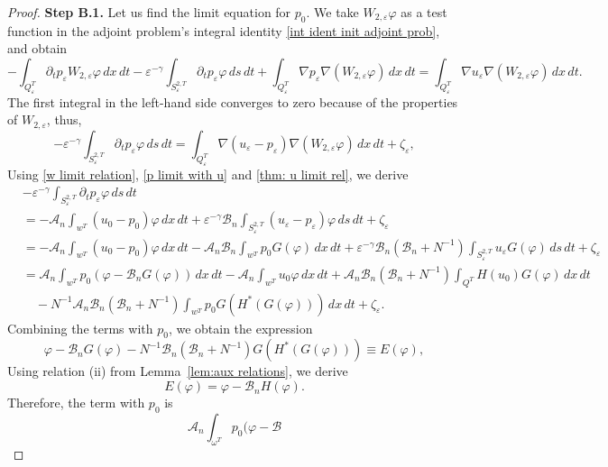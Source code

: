 \documentclass[reqno]{amsart}
\begin{document}
\begin{proof}
\noindent\textbf{Step B.1.}
Let us find the limit equation for $p_0$. We take 
$W_{2,\varepsilon }\varphi $ as a test function in the adjoint problem's
integral identity \eqref{int ident init adjoint prob}, and obtain
\[
-\int _{Q_{\varepsilon }^{T}}\partial _{t}p_{\varepsilon
}W_{2,\varepsilon }\varphi \,dx\,dt-\varepsilon ^{-\gamma }\int
_{S_{\varepsilon }^{2,T}}\partial _{t}p_{\varepsilon }\varphi \,ds\,dt%
+\int _{Q_{\varepsilon }^{T}}\nabla p_{\varepsilon }\nabla
(W_{2,\varepsilon }\varphi )\,dx\,dt=\int _{Q_{\varepsilon }^{T}}\nabla
u_{\varepsilon }\nabla (W_{2,\varepsilon }\varphi )\,dx\,dt.
\]%
The first integral in the left-hand side converges to zero because of the
properties of $W_{2,\varepsilon }$, thus,
\[
-\varepsilon ^{-\gamma }\int _{S_{\varepsilon }^{2,T}}\partial
_{t}p_{\varepsilon }\varphi \,ds\,dt=\int _{Q_{\varepsilon }^{T}}\nabla
(u_{\varepsilon }-p_{\varepsilon })\nabla (W_{2,\varepsilon }\varphi )\,dx\,dt%
+\zeta _{\varepsilon },
\]
Using \eqref{w limit relation}, \eqref{p limit with u} and
\eqref{thm: u limit rel}, we derive
\begin{align*}
&-\varepsilon ^{-\gamma }\int _{S_{\varepsilon }^{2,T}}\partial
_{t}p_{\varepsilon }\varphi \,ds\,dt\\
&=-\mathcal{A}_n\int _{w^{T}}(u_0-p_0)\varphi \,dx\,dt
 +\varepsilon ^{-\gamma }\mathcal{B}_n\int _{S_{\varepsilon }^{2,T}}
 (u_{\varepsilon }-p_{\varepsilon})\varphi \,ds\,dt
 + \zeta_\varepsilon \\
&=-\mathcal{A}_n\int _{w^{T}}(u_0-p_0)\varphi \,dx\,dt-\mathcal{A}%
_n\mathcal{B}_n\int _{w^{T}}p_0G(\varphi )\,dx\,dt+\varepsilon
^{-\gamma }\mathcal{B}_n(\mathcal{B}_n+N^{-1})\int
_{S_{\varepsilon }^{2,T}}u_{\varepsilon }G(\varphi )\,ds\,dt +
\zeta_\varepsilon \\
&=\mathcal{A}_n\int _{w^{T}}p_0(\varphi -\mathcal{B}_nG(\varphi
))\,dx\,dt-\mathcal{A}_n\int _{w^{T}}u_0\varphi \,dx\,dt+\mathcal{A}%
_n\mathcal{B}_n(\mathcal{B}_n+N^{-1})\int
_{Q^{T}}H(u_0)G(\varphi )\,dx\,dt \\
&\quad -N^{-1}\mathcal{A}_n\mathcal{B}_n(\mathcal{B}_n+N^{-1})\int%
_{w^{T}}p_0G(H^{\ast }(G(\varphi )))\,dx\,dt + \zeta_\varepsilon.
\end{align*}
Combining the terms with $p_0$, we obtain the expression
\[
\varphi -\mathcal{B}_nG(\varphi )-N^{-1}\mathcal{B}_n(\mathcal{B}%
_n+N^{-1})G(H^{\ast }(G(\varphi )))\equiv E(\varphi ),
\]%
Using relation (ii) from Lemma~\ref{lem:aux relations}, we derive
\[
E(\varphi )=\varphi -\mathcal{B}_nH(\varphi ).
\]%
Therefore, the term with $p_0$ is
\[
\mathcal{A}_n\int _{\omega ^{T}}p_0(\varphi -\mathcal{B}%
\]
\end{proof}
\end{document}
